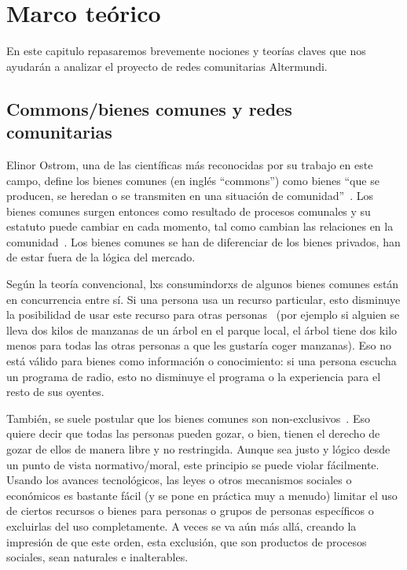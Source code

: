 \section{Marco teórico}

En este capitulo repasaremos brevemente nociones y teorías claves que nos ayudarán a analizar el proyecto de redes comunitarias Altermundi.

\subsection{Commons/bienes comunes y redes comunitarias}

Elinor Ostrom, una de las científicas más reconocidas por su trabajo en este campo, define los bienes comunes (en inglés ``commons'') como bienes ``que se producen, se heredan o se transmiten en una situación de comunidad''~\autocite{Ostrom1990}.
Los bienes comunes surgen entonces como resultado de procesos comunales y su estatuto puede cambiar en cada momento, tal como cambian las relaciones en la comunidad~\autocite{Harvey2012}.
Los bienes comunes se han de diferenciar de los bienes privados, han de estar fuera de la lógica del mercado.

Según la teoría convencional, lxs consumindorxs de algunos bienes comunes están en concurrencia entre sí.
Si una persona usa un recurso particular, esto disminuye la posibilidad de usar este recurso para otras personas~\autocite[85]{Helfrich2012}
(por ejemplo si alguien se lleva dos kilos de manzanas de un árbol en el parque local, el árbol tiene dos kilo menos para todas las otras personas a que les gustaría coger manzanas).
Eso no está válido para bienes como información o conocimiento: si una persona escucha un programa de radio, esto no disminuye el programa o la experiencia para el resto de sus oyentes.

También, se suele postular que los bienes comunes son non-exclusivos~\autocite[86]{Helfrich2012}.
Eso quiere decir que todas las personas pueden gozar, o bien, tienen el derecho de gozar de ellos de manera libre y no restringida.
Aunque sea justo y lógico desde un punto de vista normativo/moral, este principio se puede violar fácilmente.
Usando los avances tecnológicos, las leyes o otros mecanismos sociales o económicos es bastante fácil (y se pone en práctica muy a menudo) limitar el uso de ciertos recursos o bienes para personas o grupos de personas específicos o excluirlas del uso completamente.
A veces se va aún más allá, creando la impresión de que este orden, esta exclusión, que son productos de procesos sociales, sean naturales e inalterables.

